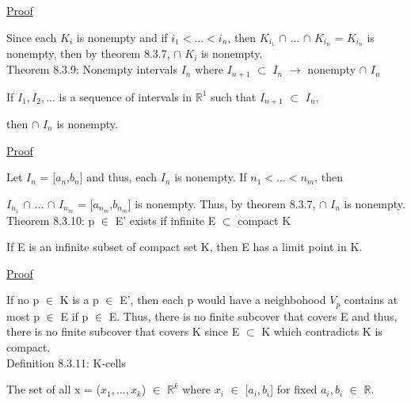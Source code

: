{ \color{magenta} \underline{Proof} } 

	Since each $K_i$ is nonempty and if $i_1 < ... < i_n$, then
	$K_{i_1}$ $\cap$ ... $\cap$ $K_{i_n}$
	= $K_{i_n}$ is nonempty, then
	by {\color{red} theorem 8.3.7}, $\cap$ $K_i$ is nonempty. \\

{ \color{red} Theorem 8.3.9: Nonempty intervals $I_n$ where
$I_{n+1}$ $\subset$ $I_n$ $\rightarrow$ nonempty $\cap$ $I_n$}

	\begin{adjustbox}{minipage=14cm, right, vspace=0.1cm 0cm}
		If $I_1, I_2, ...$ is a sequence of intervals in $\mathbb{R}^1$
		such that $I_{n+1}$ $\subset$ $I_n$,
		
		then $\cap$ $I_n$ is nonempty.
	\end{adjustbox}

{ \color{magenta} \underline{Proof} } 

	Let $I_n$ = [$a_n$,$b_n$] and thus, each $I_n$ is nonempty.
	If $n_1 < ... < n_m$, then

	$I_{n_1}$ $\cap$ ... $\cap$ $I_{n_m}$
	= [$a_{n_m}$,$b_{n_m}$] is nonempty.
	Thus, by {\color{red} theorem 8.3.7}, $\cap$ $I_n$ is nonempty. \\

{ \color{red} Theorem 8.3.10: p $\in$ E' exists if
infinite E $\subset$ compact K }

	\begin{adjustbox}{minipage=14cm, right, vspace=0.1cm 0cm}
		If E is an infinite subset of compact set K, then E has a
		limit point in K.
	\end{adjustbox}

{ \color{magenta} \underline{Proof} } 

	If no p $\in$ K is a p $\in$ E', then each p would have
	a neighbohood $V_p$ contains at most p $\in$ E if p $\in$ E.
	Thus, there is no finite subcover that covers E and thus,
	there is no finite subcover that covers K since E $\subset$ K
	which contradicts K is compact. \\

{ \color{blue} Definition 8.3.11: K-cells } 

	\begin{adjustbox}{minipage=14cm, right, vspace=0.1cm 0cm}
		The set of all x = ($x_1, ... , x_k$) $\in$ $\mathbb{R}^k$
		where $x_i$ $\in$ [$a_i,b_i$] for fixed $a_i,b_i$ $\in$ $\mathbb{R}$. \\
	\end{adjustbox}

